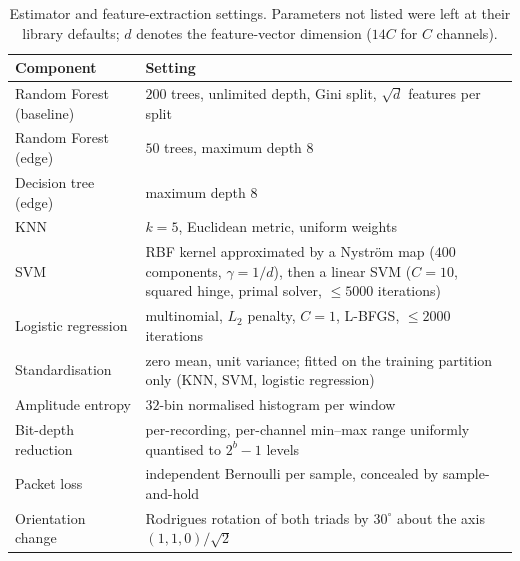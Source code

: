 \begin{table}[t]
\centering
\caption{Estimator and feature-extraction settings. Parameters not listed were
left at their library defaults; $d$ denotes the feature-vector dimension
($14C$ for $C$ channels).}
\label{tab:impl}
\renewcommand{\arraystretch}{1.25}
\small
\begin{tabular}{@{}p{3.6cm}p{10.9cm}@{}}
\toprule
\textbf{Component} & \textbf{Setting} \\
\midrule
Random Forest (baseline)   & $200$ trees, unlimited depth, Gini split,
                             $\sqrt{d}$ features per split \\
Random Forest (edge)       & $50$ trees, maximum depth $8$ \\
Decision tree (edge)       & maximum depth $8$ \\
KNN                        & $k=5$, Euclidean metric, uniform weights \\
SVM                        & RBF kernel approximated by a Nystr\"om map
                             ($400$ components, $\gamma=1/d$), then a linear
                             SVM ($C=10$, squared hinge, primal solver,
                             $\leq5000$ iterations) \\
Logistic regression        & multinomial, $L_2$ penalty, $C=1$, L-BFGS,
                             $\leq2000$ iterations \\
Standardisation            & zero mean, unit variance; fitted on the training
                             partition only (KNN, SVM, logistic regression) \\
Amplitude entropy          & $32$-bin normalised histogram per window \\
Bit-depth reduction        & per-recording, per-channel min--max range
                             uniformly quantised to $2^{b}-1$ levels \\
Packet loss                & independent Bernoulli per sample, concealed by
                             sample-and-hold \\
Orientation change         & Rodrigues rotation of both triads by
                             $30^{\circ}$ about the axis $(1,1,0)/\sqrt{2}$ \\
\bottomrule
\end{tabular}
\end{table}

